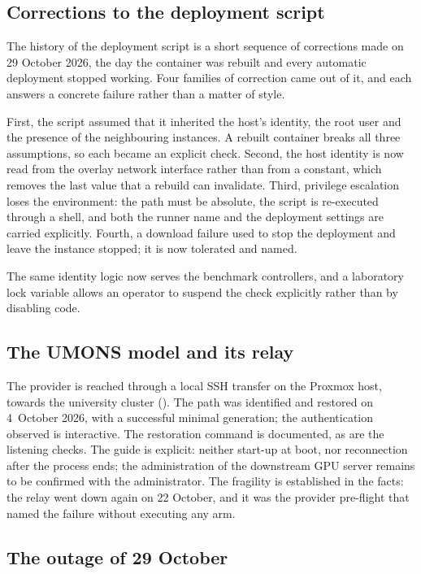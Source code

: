 \subsection{Corrections to the deployment script}

The history of the deployment script is a short sequence of corrections made on
29 October 2026, the day the container was rebuilt and every automatic deployment
stopped working. Four families of correction came out of it, and each answers a
concrete failure rather than a matter of style.

First, the script assumed that it inherited the host's identity, the root user and
the presence of the neighbouring instances. A rebuilt container breaks all three
assumptions, so each became an explicit check. Second, the host identity is now
read from the overlay network interface rather than from a constant, which removes
the last value that a rebuild can invalidate. Third, privilege escalation loses the
environment: the path must be absolute, the script is re-executed through a shell,
and both the runner name and the deployment settings are carried explicitly.
Fourth, a download failure used to stop the deployment and leave the instance
stopped; it is now tolerated and named.

The same identity logic now serves the benchmark controllers, and a laboratory lock
variable allows an operator to suspend the check explicitly rather than by
disabling code.

\subsection{The UMONS model and its relay}

The  provider is reached through a local SSH transfer on the
Proxmox host, towards the university cluster (). The
path was identified and restored on 4~October 2026, with a successful minimal
generation; the authentication observed is interactive. The restoration command is
documented, as are the listening checks. The guide is explicit: neither start-up
at boot, nor reconnection after the process ends; the administration of the
downstream GPU server remains to be confirmed with the administrator. The
fragility is established in the facts: the relay went down again on 22 October,
and it was the provider pre-flight that named the failure without executing any
arm.

\subsection{The outage of 29 October}

